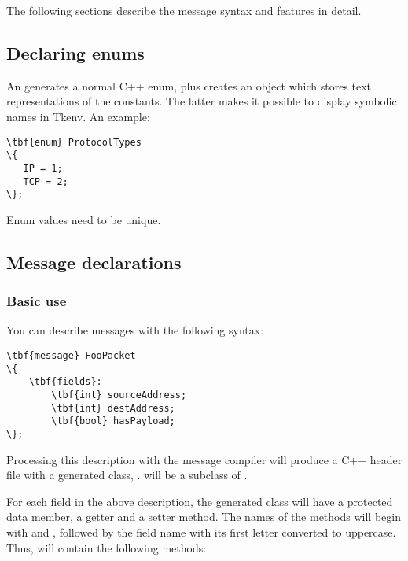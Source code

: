 The following sections describe the message syntax and features in detail.


\subsection{Declaring enums}

An  generates a normal C++ enum, plus creates an object
which stores text representations of the constants. The latter makes it possible
to display symbolic names in Tkenv.
An example:

\begin{Verbatim}[commandchars=\\\{\}]
\tbf{enum} ProtocolTypes
\{
   IP = 1;
   TCP = 2;
\};
\end{Verbatim}

Enum values need to be unique.


%

\subsection{Message declarations}

\subsubsection{Basic use}

You can describe messages with the following syntax:

\begin{Verbatim}[commandchars=\\\{\}]
\tbf{message} FooPacket
\{
    \tbf{fields}:
        \tbf{int} sourceAddress;
        \tbf{int} destAddress;
        \tbf{bool} hasPayload;
\};
\end{Verbatim}

Processing this description with the message compiler will produce
a C++ header file with a generated class, .
 will be a subclass of .

For each field in the above description, the generated class will have
a protected data member, a getter and a setter method. The names of the
methods will begin with  and ,
followed by the field name with its first letter converted to uppercase.
Thus,  will contain the following methods:

